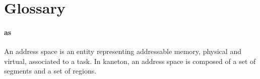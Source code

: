 
%
%

\chapter{Glossary}

\subsubsection{as}

An address space is an entity representing addressable memory,
physical and virtual, associated to a task. In kaneton, an address space
is composed of a set of segments and a set of regions.
